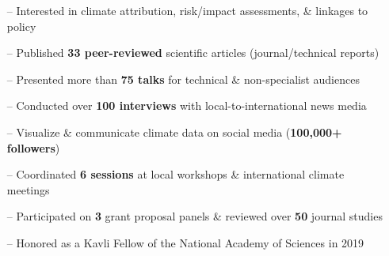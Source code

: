 \documentclass[10pt,letterpaper]{altacv} %
\begin{document}
\tagline{}

%

\begin{fullwidth}
\makecvheader
\end{fullwidth}

%

\vspace{-0.09in}
\begin{itemize}
    \setlength{\itemindent}{0.5em}
    \item[--] \small{Interested in climate attribution, risk\slash impact assessments, \& linkages to policy}
    \item[--] \small{Published \textbf{33 peer-reviewed} scientific articles (journal/technical reports)}
    \item[--] \small{Presented more than \textbf{75 talks} for technical \& non-specialist audiences}
    \item[--] \small{Conducted over \textbf{100 interviews} with local-to-international news media}
    \item[--] \small{Visualize \& communicate climate data on social media (\textbf{100,000+ followers})}
    \item[--] \small{Coordinated \textbf{6 sessions} at local workshops \& international climate meetings}
    \item[--] \small{Participated on \textbf{3} grant proposal panels \& reviewed over \textbf{50} journal studies}    
    \item[--] \small{Honored as a Kavli Fellow of the National Academy of Sciences in 2019}
\end{itemize}
\smallskip

\vspace*{-0.2cm}
\end{document}
